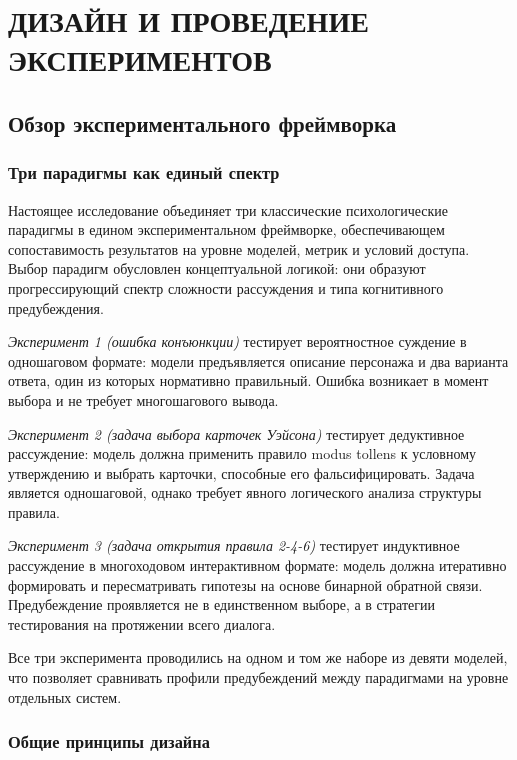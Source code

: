 \chapter{ДИЗАЙН И ПРОВЕДЕНИЕ ЭКСПЕРИМЕНТОВ}

\section{Обзор экспериментального фреймворка}

\subsection{Три парадигмы как единый спектр}

Настоящее исследование объединяет три классические психологические парадигмы в едином экспериментальном фреймворке, обеспечивающем сопоставимость результатов на уровне моделей, метрик и условий доступа. Выбор парадигм обусловлен концептуальной логикой: они образуют прогрессирующий спектр сложности рассуждения и типа когнитивного предубеждения.

\textit{Эксперимент 1 (ошибка конъюнкции)} тестирует вероятностное суждение в одношаговом формате: модели предъявляется описание персонажа и два варианта ответа, один из которых нормативно правильный. Ошибка возникает в момент выбора и не требует многошагового вывода.

\textit{Эксперимент 2 (задача выбора карточек Уэйсона)} тестирует дедуктивное рассуждение: модель должна применить правило modus tollens к условному утверждению и выбрать карточки, способные его фальсифицировать. Задача является одношаговой, однако требует явного логического анализа структуры правила.

\textit{Эксперимент 3 (задача открытия правила 2-4-6)} тестирует индуктивное рассуждение в многоходовом интерактивном формате: модель должна итеративно формировать и пересматривать гипотезы на основе бинарной обратной связи. Предубеждение проявляется не в единственном выборе, а в стратегии тестирования на протяжении всего диалога.

Все три эксперимента проводились на одном и том же наборе из девяти моделей, что позволяет сравнивать профили предубеждений между парадигмами на уровне отдельных систем.

\subsection{Общие принципы дизайна}

